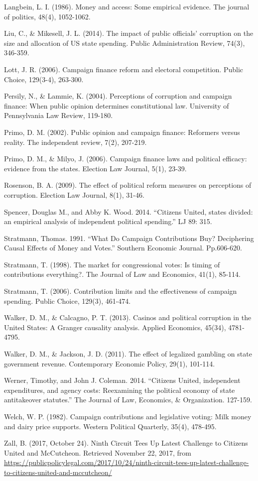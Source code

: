 \documentclass{jopsubmission}
\begin{document}
Langbein, L. I. (1986). Money and access: Some empirical evidence. The
journal of politics, 48(4), 1052-1062.

Liu, C., \& Mikesell, J. L. (2014). The impact of public officials'
corruption on the size and allocation of US state spending. Public
Administration Review, 74(3), 346-359.

Lott, J. R. (2006). Campaign finance reform and electoral competition.
Public Choice, 129(3-4), 263-300.

Persily, N., \& Lammie, K. (2004). Perceptions of corruption and
campaign finance: When public opinion determines constitutional law.
University of Pennsylvania Law Review, 119-180.

Primo, D. M. (2002). Public opinion and campaign finance: Reformers
versus reality. The independent review, 7(2), 207-219.

Primo, D. M., \& Milyo, J. (2006). Campaign finance laws and political
efficacy: evidence from the states. Election Law Journal, 5(1), 23-39.

Rosenson, B. A. (2009). The effect of political reform measures on
perceptions of corruption. Election Law Journal, 8(1), 31-46.

Spencer, Douglas M., and Abby K. Wood. 2014. ``Citizens United, states
divided: an empirical analysis of independent political spending.'' LJ
89: 315.

Stratmann, Thomas. 1991. ``What Do Campaign Contributions Buy?
Deciphering Causal Effects of Money and Votes.'' Southern Economic
Journal. Pp.606-620.

Stratmann, T. (1998). The market for congressional votes: Is timing of
contributions everything?. The Journal of Law and Economics, 41(1),
85-114.

Stratmann, T. (2006). Contribution limits and the effectiveness of
campaign spending. Public Choice, 129(3), 461-474.

Walker, D. M., \& Calcagno, P. T. (2013). Casinos and political
corruption in the United States: A Granger causality analysis. Applied
Economics, 45(34), 4781-4795.

Walker, D. M., \& Jackson, J. D. (2011). The effect of legalized
gambling on state government revenue. Contemporary Economic Policy,
29(1), 101-114.

Werner, Timothy, and John J. Coleman. 2014. ``Citizens United,
independent expenditures, and agency costs: Reexamining the political
economy of state antitakeover statutes.'' The Journal of Law, Economics,
\& Organization. 127-159.

Welch, W. P. (1982). Campaign contributions and legislative voting: Milk
money and dairy price supports. Western Political Quarterly, 35(4),
478-495.

Zall, B. (2017, October 24). Ninth Circuit Tees Up Latest Challenge to
Citizens United and McCutcheon. Retrieved November 22, 2017, from
\url{https://publicpolicylegal.com/2017/10/24/ninth-circuit-tees-up-latest-challenge-to-citizens-united-and-mccutcheon/}
\end{document}
